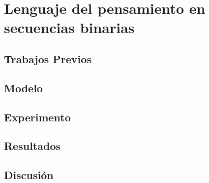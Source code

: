 \chapter{Lenguaje del pensamiento en secuencias binarias}

\section{Trabajos Previos}
\section{Modelo}
\section{Experimento}
\section{Resultados}
\section{Discusión}

